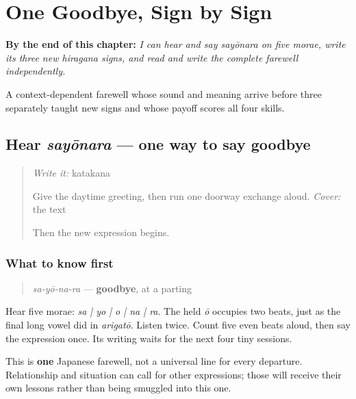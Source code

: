
\chapter{One Goodbye, Sign by Sign}
\label{ch:ja-sayounara}

\begin{chapteropening}
\textbf{By the end of this chapter:} \emph{I can hear and say sayōnara on five morae, write its three new hiragana signs, and read and write the complete farewell independently.}

A context-dependent farewell whose sound and meaning arrive before three separately taught new signs and whose payoff scores all four skills.
\end{chapteropening}

\section[sayōnara]{Hear \emph{sayōnara} — one way to say goodbye}

\label{lesson:JA-C08-hear-sayounara}



\begin{quote}
\emph{Write it:} katakana \textbf{}

Give the daytime greeting, then run one doorway exchange aloud. \emph{Cover:} the text

Then the new expression begins.
\end{quote}

\subsection*{What to know first}
\begin{quote}
\emph{sa-yō-na-ra} — \textbf{goodbye}, at a parting
\end{quote}

Hear five morae: \emph{sa | yo | o | na | ra}. The held \emph{ō} occupies two beats, just as the final long vowel did in \emph{arigatō}. Listen twice. Count five even beats aloud, then say the expression once. Its writing waits for the next four tiny sessions.

This is \textbf{one} Japanese farewell, not a universal line for every departure. Relationship and situation can call for other expressions; those will receive their own lessons rather than being smuggled into this one.

